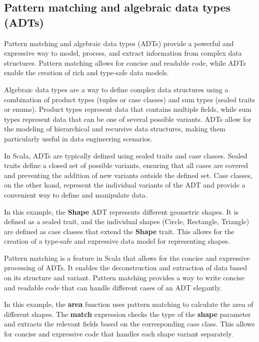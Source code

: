 \subsection{Pattern matching and algebraic data types (ADTs)}

Pattern matching and algebraic data types (ADTs) provide a powerful and expressive way to model, process, and extract information from complex data structures. Pattern matching allows for concise and readable code, while ADTs enable the creation of rich and type-safe data models.

Algebraic data types are a way to define complex data structures using a combination of product types (tuples or case classes) and sum types (sealed traits or enums). Product types represent data that contains multiple fields, while sum types represent data that can be one of several possible variants. ADTs allow for the modeling of hierarchical and recursive data structures, making them particularly useful in data engineering scenarios.

In Scala, ADTs are typically defined using sealed traits and case classes. Sealed traits define a closed set of possible variants, ensuring that all cases are covered and preventing the addition of new variants outside the defined set. Case classes, on the other hand, represent the individual variants of the ADT and provide a convenient way to define and manipulate data.



In this example, the \textbf{Shape} ADT represents different geometric shapes. It is defined as a sealed trait, and the individual shapes (Circle, Rectangle, Triangle) are defined as case classes that extend the \textbf{Shape} trait. This allows for the creation of a type-safe and expressive data model for representing shapes.

Pattern matching is a feature in Scala that allows for the concise and expressive processing of ADTs. It enables the deconstruction and extraction of data based on its structure and variant. Pattern matching provides a way to write concise and readable code that can handle different cases of an ADT elegantly.



In this example, the \textbf{area} function uses pattern matching to calculate the area of different shapes. The \textbf{match} expression checks the type of the \textbf{shape} parameter and extracts the relevant fields based on the corresponding case class. This allows for concise and expressive code that handles each shape variant separately.

